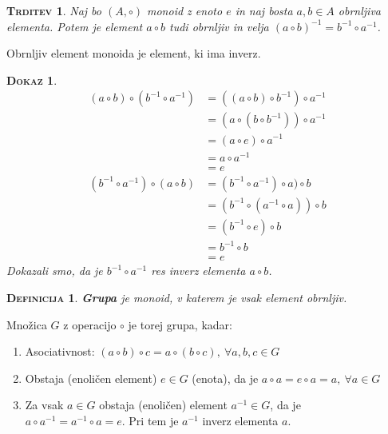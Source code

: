 \documentclass[a4paper,12pt]{article}
\newtheorem*{trditev}{\textsc{Trditev}}
\newtheorem*{definicija}{\textsc{Definicija}}
\newtheorem*{dokaz}{\textsc{Dokaz}}
\begin{document}
\begin{trditev}
Naj bo $(A, \circ)$ monoid z enoto $e$ in naj bosta $a,b\in A$ obrnljiva elementa. Potem je element $a \circ b$ tudi obrnljiv in velja $(a\circ b)^{-1}=b^{-1}\circ a^{-1}$. 
\end{trditev}

\noindent Obrnljiv element monoida je element, ki ima inverz. \\

\begin{dokaz}
\begin{align*}
(a\circ b)\circ (b^{-1}\circ a^{-1}) & = ((a\circ b)\circ b^{-1})\circ a^{-1}\\
& = (a\circ (b\circ b^{-1}))\circ a^{-1}\\
& =(a\circ e)\circ a^{-1} \\
& = a\circ a^{-1} \\
& = e 
\end{align*}
\begin{align*}
(b^{-1} \circ a^{-1})\circ (a\circ b) & =(b^{-1}\circ a^{-1})\circ a)\circ b \\
& =(b^{-1}\circ (a^{-1} \circ a))\circ b\\
& =(b^{-1}\circ e)\circ b  \\
& =b^{-1}\circ b \\
& =e
\end{align*}
Dokazali smo, da je $b^{-1}\circ a^{-1}$ res inverz elementa $a\circ b$.\\
\end{dokaz}

\begin{definicija}
\textbf{Grupa} je monoid, v katerem je vsak element obrnljiv.
\end{definicija}

\newpage 

\noindent Množica $G$ z operacijo $\circ$ je torej grupa, kadar:
\begin{enumerate}
\item Asociativnost: $(a\circ b)\circ c=a\circ(b\circ c),~\forall a,b,c\in G$
\item Obstaja (enoličen element) $e\in G$ (enota), da je $a\circ a=e\circ a=a,~\forall a\in G$
\item Za vsak $a\in G$ obstaja (enoličen) element $a^{-1}\in G$, da je \\
$a\circ a^{-1}=a^{-1}\circ a=e$. Pri tem je $a^{-1}$ inverz elementa $a$.\\
\end{enumerate}
\end{document}
